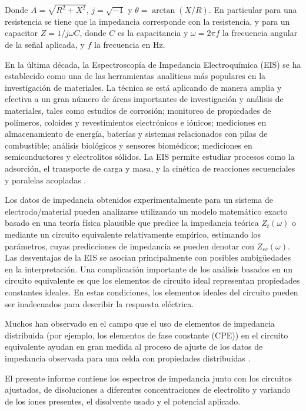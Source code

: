 \documentclass[fleqn,11pt]{SelfArx}
\begin{document}
	Donde $A = \sqrt{R^2 + X^2}$, $j = \sqrt{-1}$ y $\theta = \arctan(X/R)$. En particular para una resistencia se tiene que la impedancia corresponde con la resistencia, y para un capacitor $Z = 1/j\omega C$, donde $C$ es la capacitancia y $\omega = 2\pi f$ la frecuencia angular de la se\~nal aplicada, y $f$ la frecuencia en Hz.
	
	En la última década, la Espectroscopía de Impedancia Electroquímica (EIS) se ha establecido como una de las herramientas analíticas más populares en la investigación de materiales. La técnica se está aplicando de manera amplia y efectiva a un gran número de áreas importantes de investigación y análisis de materiales, tales como estudios de corrosión; monitoreo de propiedades de polímeros, coloides y revestimientos electrónicos e iónicos; mediciones en almacenamiento de energía, baterías y sistemas relacionados con pilas de combustible; análisis biológicos y sensores biomédicos; mediciones en semiconductores y electrolitos sólidos. La EIS permite estudiar procesos como la adsorción, el transporte de carga y masa, y la cinética de reacciones secuenciales y paralelas acopladas \cite{lvovich2012impedance}.
	
	Los datos de impedancia obtenidos experimentalmente para un sistema de electrodo/material pueden analizarse utilizando un modelo matemático exacto basado en una teoría física plausible que predice la impedancia teórica $Z_t(\omega)$ o mediante un circuito equivalente relativamente empírico, estimando los parámetros, cuyas predicciones de impedancia se pueden denotar con $Z_{ec}(\omega)$. Las desventajas de la EIS se asocian principalmente con posibles ambigüedades en la interpretación. Una complicación importante de los análisis basados en un circuito equivalente es que los elementos de circuito ideal representan propiedades constantes ideales. En estas condiciones, los elementos ideales del circuito pueden ser inadecuados para describir la respuesta eléctrica.
	
	Muchos han observado en el campo que el uso de elementos de impedancia distribuida (por ejemplo, los elementos de fase constante (CPE)) en el circuito equivalente ayudan en gran medida al proceso de ajuste de los datos de impedancia observada para una celda con propiedades distribuidas \cite{macdonald2005impedance}.

	El presente informe contiene los espectros de impedancia junto con los circuitos ajustados, de disoluciones a diferentes concentraciones de electrolito y variando de los iones presentes, el disolvente usado y el potencial aplicado.
		
\end{document}
